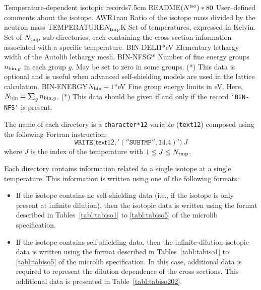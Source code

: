 \begin{DescriptionEnregistrement}{Temperature-dependent isotopic records}{7.5cm}
\label{tabl:tabiso201}
\CharEnr
  {README}{$(N^{\rm iso})*80$}
  {User--defined comments about the isotope.}
\RealEnr
  {AWR}{$1$}{nau}
  {Ratio of the isotope mass divided by the neutron mass}
\RealEnr
  {TEMPERATURE}{$N_{\rm tmp}$}{K}
  {Set of temperatures, expressed in Kelvin.}
\DirVar
  {}
  {Set of $N_{\rm tmp}$ sub-directories, each containing the cross section information
   associated with a specific temperature.}
\OptRealEnr
  {BIN-DELI}{$1$}{*}{eV}
  {Elementary lethargy width of the Autolib lethargy mesh.}
\OptIntEnr
  {BIN-NFS}{$G$}{*}
  {Number of fine energy groups $n_{{\rm bin},g}$ in each group $g$. May be set to zero
  in some groups. (*) This data is optional and is useful when advanced self-shielding
  models are used in the lattice calculation.}
\OptRealEnr
  {BIN-ENERGY}{$N_{\rm bin}+1$}{*}{eV}
  {Fine group energy limits in eV. Here, $N_{\rm bin}=\sum_g n_{{\rm bin},g}$. (*) This data
  should be given if and only if the record {\tt `BIN-NFS'} is present.}
\end{DescriptionEnregistrement}

The name of each  directory is a {\tt character*12} variable ({\tt text12})
composed using the following Fortran instruction:
$$
\mathtt{WRITE(}\mathsf{text12}\mathtt{,'(''SUBTMP'',I4.4)')}\: J
$$
where $J$ is the index of the temperature with $1 \leq J \le N_{\rm tmp}$.

\vskip 0.2cm

Each  directory contains information related to a single isotope
at a single temperature. This information is written using one of the following formats:
\begin{itemize}
\item If the isotope contains no self-shielding data (i.e., if the isotope is
only present at infinite dilution), then the isotopic data is written using the format described
in Tables~\ref{tabl:tabiso1} to \ref{tabl:tabiso5} of the {\sc microlib}
specification.
\item If the isotope contains self-shielding data, then the infinite-dilution isotopic data is
written using the format described in Tables~\ref{tabl:tabiso1} to \ref{tabl:tabiso5} of the
{\sc microlib} specification. In this case, additional data is required to represent the
dilution dependence of the cross sections. This additional data is presented in Table~\ref{tabl:tabiso202}.
\end{itemize}

